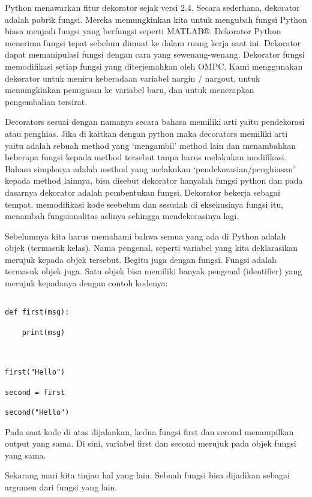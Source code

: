 Python menawarkan fitur dekorator sejak versi 2.4. Secara sederhana, dekorator adalah pabrik fungsi. Mereka memungkinkan kita untuk mengubah fungsi Python biasa menjadi fungsi yang berfungsi seperti MATLAB®. Dekorator Python menerima fungsi tepat sebelum dimuat ke dalam ruang kerja saat ini. Dekorator dapat memanipulasi fungsi dengan cara yang sewenang-wenang. Dekorator fungsi memodifikasi setiap fungsi yang diterjemahkan oleh OMPC. Kami menggunakan dekorator untuk meniru keberadaan variabel nargin / nargout, untuk memungkinkan penugasan ke variabel baru, dan untuk menerapkan pengembalian tersirat.

Decorators sesuai dengan namanya secara bahasa memiliki arti yaitu pendekorasi atau penghias. Jika di kaitkan dengan python maka decorators memiliki arti yaitu adalah sebuah method yang ‘mengambil’ method lain dan menambahkan beberapa fungsi kepada method tersebut tanpa harus melakukan modifikasi. Bahasa simplenya adalah method yang melakukan ‘pendekorasian/penghiasan’ kepada method lainnya, bisa disebut dekorator hanyalah fungsi python dan pada dasarnya dekorator adalah pembentukan fungsi. Dekorator bekerja sebagai tempat. memodifikasi kode seebelum dan sesudah di eksekusinya fungsi itu, menambah fungsionalitas aslinya sehingga mendekorasinya lagi.



Sebelumnya kita harus memahami bahwa semua yang ada di Python adalah objek (termasuk kelas). Nama pengenal, seperti variabel yang kita deklarasikan merujuk kepada objek tersebut. Begitu juga dengan fungsi. Fungsi adalah termasuk objek juga. Satu objek bisa memiliki banyak pengenal (identifier) yang merujuk kepadanya dengan contoh kodenya:



\begin{verbatim}

def first(msg):

    print(msg)



first("Hello")

second = first

second("Hello")

\end{verbatim}



Pada saat kode di atas dijalankan, kedua fungsi first dan second menampilkan output yang sama. Di sini, variabel first dan second merujuk pada objek fungsi yang sama.

Sekarang mari kita tinjau hal yang lain. Sebuah fungsi bisa dijadikan sebagai argumen dari fungsi yang lain.

